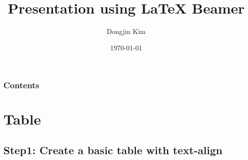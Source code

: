 \documentclass[article]{beamer}
\title{Presentation using \LaTeX{} Beamer}
\author{Dongjin Kim}
\institute{Computer Science and Software Engineering \\ Auburn University}
\date{\scriptsize{\today}}
\begin{document}
\maketitle


\begin{frame}
\frametitle{Contents}
\tableofcontents
\end{frame}

\section{Table}
\subsection{Step1: Create a basic table with text-align}
\end{document}

